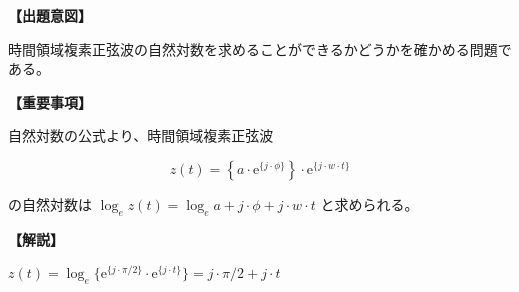 \noindent \textbf{【出題意図】}

\bigskip
\noindent 時間領域複素正弦波の自然対数を求めることができるかどうかを確かめる問題である。

\vspace{1em}
\noindent \textbf{【重要事項】}

\medskip
\noindent 自然対数の公式より、時間領域複素正弦波 

\[
z(t) = \left \{ a \cdot \textrm{e}^{\{j \cdot \phi\}} \right \} \cdot \textrm{e}^{\{j \cdot w \cdot t \}}
\]

\bigskip
\noindent の自然対数は $\log_e z(t) =  \log_e a + j \cdot \phi + j \cdot w \cdot t$ と求められる。

\bigskip

\vspace{1em}
\noindent \textbf{【解説】}

\bigskip
\noindent $z(t) = \log_e \{ \textrm{e}^{ \{j \cdot \pi/2 \} } \cdot \textrm{e}^{ \{j \cdot t \} } \} = j \cdot \pi/2 + j \cdot t $
